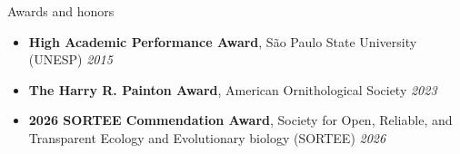 \documentclass{resume}
\begin{document}

\begin{rSection}{Awards and honors} 
\begin{itemize}
\item {\textbf{High Academic Performance Award}, São Paulo State University (UNESP)} \hfill{\em 2015}
\item {\textbf{The Harry R. Painton Award}, American Ornithological Society} \hfill{\em 2023}
\item {\textbf{2026 SORTEE Commendation Award}, Society for Open, Reliable, and Transparent Ecology and Evolutionary biology (SORTEE)
} \hfill{\em 2026}
\end{itemize}
\end{rSection}

\end{document}
